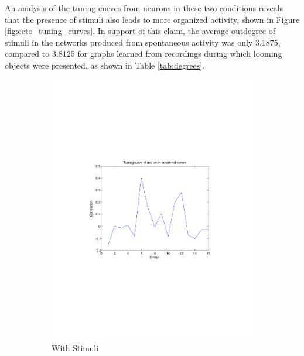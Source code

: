 \documentclass{article}
\begin{document}
An analysis of the tuning curves from neurons in these two conditions reveals 
that the presence of stimuli also leads to more organized activity, shown in 
Figure \ref{fig:ecto_tuning_curves}. In support of this claim, the average 
outdegree of stimuli in the networks produced from spontaneous activity was 
only 3.1875, compared to 3.8125 for graphs learned from recordings during 
which looming objects were presented, as shown in Table \ref{tab:degrees}.\par

\begin{figure}[ht]
  \centering
  
  \begin{subfigure}{0.45\textwidth}
    \includegraphics[width=\textwidth]{ECNeuronTuningCurve_LoomObj}
    \caption{With Stimuli}
    \label{fig:loom_obj_tuning}
  \end{subfigure}
  ~
  \begin{subfigure}{0.45\textwidth}

\end{subfigure}
\end{figure}
\end{document}
